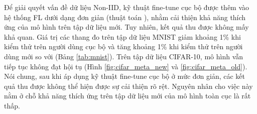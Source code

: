 Để giải quyết vấn đề dữ liệu Non-IID, kỹ thuật fine-tune cục bộ được thêm vào hệ thống FL dưới dạng đơn giản (thuật toán ), nhằm cải thiện khả năng thích ứng của mô hình trên tập dữ liệu mới. Tuy nhiên, kết quả thu được không mấy khả quan. Giá trị các thang đo trên tập dữ liệu MNIST giảm khoảng 1\% khi kiểm thử trên người dùng cục bộ và tăng khoảng 1\% khi kiểm thử trên người dùng mới so với  (Bảng \ref{tab:mnist}). Trên tập dữ liệu CIFAR-10, mô hình vẫn tiếp tục không đạt hội tụ (Hình \ref{fig:cifar_meta_new} và \ref{fig:cifar_meta_old}). Nói chung, sau khi áp dụng kỹ thuật fine-tune cục bộ ở mức đơn giản, các kết quả thu được không thể hiện được sự cải thiện rõ rệt. Nguyên nhân cho việc này nằm ở chỗ khả năng thích ứng trên tập dữ liệu mới của mô hình toàn cục là rất thấp.

\begin{table}[H]
    \centering
    \caption{Bảng kết quả (\%) của thuật toán FedMeta và FedAvg trên tập dữ liệu MNIST}
    \label{tab:mnist}
\end{table}
